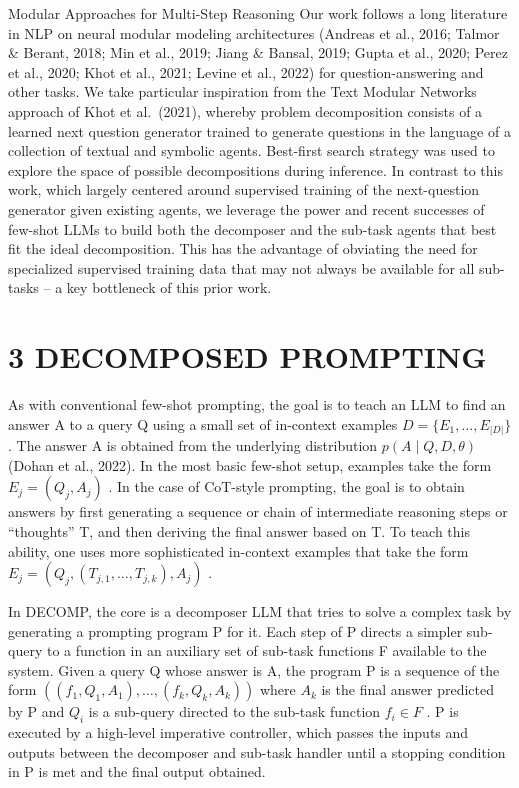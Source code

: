 \documentclass[
]{article}
\begin{document}
Modular Approaches for Multi-Step Reasoning Our work follows a long
literature in NLP on neural modular modeling architectures (Andreas et
al., 2016; Talmor \& Berant, 2018; Min et al., 2019; Jiang \& Bansal,
2019; Gupta et al., 2020; Perez et al., 2020; Khot et al., 2021; Levine
et al., 2022) for question-answering and other tasks. We take particular
inspiration from the Text Modular Networks approach of Khot et
al.~(2021), whereby problem decomposition consists of a learned next
question generator trained to generate questions in the language of a
collection of textual and symbolic agents. Best-first search strategy
was used to explore the space of possible decompositions during
inference. In contrast to this work, which largely centered around
supervised training of the next-question generator given existing
agents, we leverage the power and recent successes of few-shot LLMs to
build both the decomposer and the sub-task agents that best fit the
ideal decomposition. This has the advantage of obviating the need for
specialized supervised training data that may not always be available
for all sub-tasks -- a key bottleneck of this prior work.

\section{3 DECOMPOSED PROMPTING}\label{decomposed-prompting}

As with conventional few-shot prompting, the goal is to teach an LLM to
find an answer A to a query Q using a small set of in-context examples
\(D = \{E_{1}, \ldots, E_{|D|}\}\) . The answer A is obtained from the
underlying distribution \(p(A \mid Q, D, \theta)\) (Dohan et al., 2022).
In the most basic few-shot setup, examples take the form
\(E_{j} = (Q_{j}, A_{j})\) . In the case of CoT-style prompting, the
goal is to obtain answers by first generating a sequence or chain of
intermediate reasoning steps or ``thoughts'' T, and then deriving the
final answer based on T. To teach this ability, one uses more
sophisticated in-context examples that take the form
\(E_{j} = (Q_{j}, (T_{j,1}, \ldots, T_{j,k}), A_{j})\) .

In DECOMP, the core is a decomposer LLM that tries to solve a complex
task by generating a prompting program P for it. Each step of P directs
a simpler sub-query to a function in an auxiliary set of sub-task
functions F available to the system. Given a query Q whose answer is A,
the program P is a sequence of the form
\(\left((f_{1}, Q_{1}, A_{1}), \ldots, (f_{k}, Q_{k}, A_{k})\right)\)
where \(A_{k}\) is the final answer predicted by P and \(Q_{i}\) is a
sub-query directed to the sub-task function \(f_{i} \in F\) . P is
executed by a high-level imperative controller, which passes the inputs
and outputs between the decomposer and sub-task handler until a stopping
condition in P is met and the final output obtained.
\end{document}
